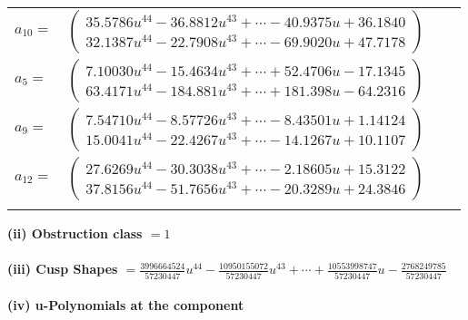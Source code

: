 \documentclass[1p]{elsarticle_modified}
\theoremstyle{definition}
\begin{document}
\begin{tabular}{m{7pt} m{180pt} m{7pt} m{180pt} }
\flushright $a_{10}=$&$\begin{pmatrix}35.5786 u^{44}-36.8812 u^{43}+\cdots-40.9375 u+36.1840\\32.1387 u^{44}-22.7908 u^{43}+\cdots-69.9020 u+47.7178\end{pmatrix}$ \\
\flushright $a_{5}=$&$\begin{pmatrix}7.10030 u^{44}-15.4634 u^{43}+\cdots+52.4706 u-17.1345\\63.4171 u^{44}-184.881 u^{43}+\cdots+181.398 u-64.2316\end{pmatrix}$ \\
\flushright $a_{9}=$&$\begin{pmatrix}7.54710 u^{44}-8.57726 u^{43}+\cdots-8.43501 u+1.14124\\15.0041 u^{44}-22.4267 u^{43}+\cdots-14.1267 u+10.1107\end{pmatrix}$ \\
\flushright $a_{12}=$&$\begin{pmatrix}27.6269 u^{44}-30.3038 u^{43}+\cdots-2.18605 u+15.3122\\37.8156 u^{44}-51.7656 u^{43}+\cdots-20.3289 u+24.3846\end{pmatrix}$\\&\end{tabular}
\flushleft \textbf{(ii) Obstruction class $= 1$}\\~\\
\flushleft \textbf{(iii) Cusp Shapes $= \frac{3996664524}{57230447} u^{44}-\frac{10950155072}{57230447} u^{43}+\cdots+\frac{10553998747}{57230447} u-\frac{2768249785}{57230447}$}\\~\\
\newpage\renewcommand{\arraystretch}{1}
\flushleft \textbf{(iv) u-Polynomials at the component}\newline \\
\end{document}
